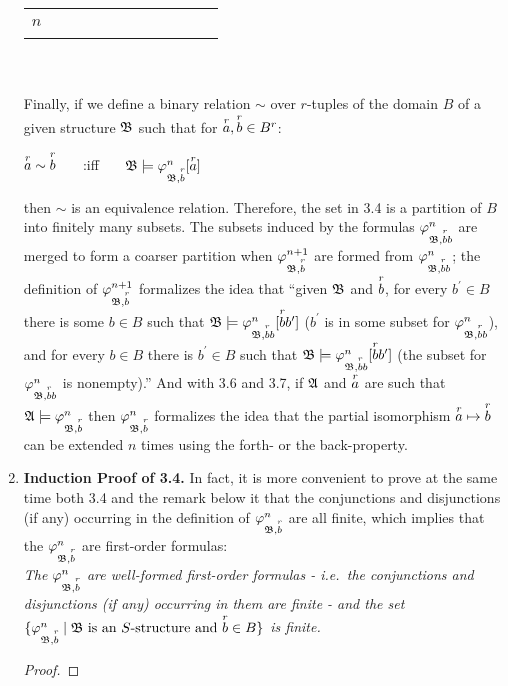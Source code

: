 \begin{enumerate}[1.]
\begin{tabular}{c|ccccccc}
$n$ & \ & \ & \ & \ & \ & \ & \ 
\end{tabular}\\
\ \\
Finally, if we define a binary relation $\sim$ over $r$-tuples of the domain $B$ of a given structure $\struct{B}$ such that for $\vect{a}{r}, \vect{b}{r} \in B^r$:
\begin{medcenter}
$\vect{a}{r} \sim \vect{b}{r}$ \ \ \ :iff \ \ \ $\struct{B} \models \varphi^n_{\struct{B}, \vect{b}{r}}[\vect{a}{r}]$
\end{medcenter}
then $\sim$ is an equivalence relation. Therefore, the set in 3.4 is a partition of $B$ into finitely many subsets. The subsets induced by the formulas $\varphi^n_{\struct{B}, \vect{b}{r}b}$ are merged to form a coarser partition when $\varphi^{n + 1}_{\struct{B}, \vect{b}{r}}$ are formed from $\varphi^n_{\struct{B}, \vect{b}{r}b}$; the definition of $\varphi^{n + 1}_{\struct{B}, \vect{b}{r}}$ formalizes the idea that ``given $\struct{B}$ and $\vect{b}{r}$, for every $b^\prime \in B$ there is some $b \in B$ such that $\struct{B} \models \varphi^n_{\struct{B}, \vect{b}{r}b}[\vect{b}{r}b^\prime]$ ($b^\prime$ is in some subset for $\varphi^n_{\struct{B}, \vect{b}{r}b}$), and for every $b \in B$ there is $b^\prime \in B$ such that $\struct{B} \models \varphi^n_{\struct{B}, \vect{b}{r}b}[\vect{b}{r}b^\prime]$ (the subset for $\varphi^n_{\struct{B}, \vect{b}{r}b}$ is nonempty).'' And with 3.6 and 3.7, if $\struct{A}$ and $\vect{a}{r}$ are such that $\struct{A} \satis \varphi^n_{\struct{B}, \vect{b}{r}}$ then $\varphi^n_{\struct{B}, \vect{b}{r}}$ formalizes the idea that the partial isomorphism $\funbyvect{\vect{a}{r}}{\vect{b}{r}}$ can be extended $n$ times using the forth- or the back-property.
%
\item \textbf{Induction Proof of 3.4.} In fact, it is more convenient to prove at the same time both 3.4 and the remark below it that the conjunctions and disjunctions (if any) occurring in the definition of $\varphi^n_{\struct{B}, \vect{b}{r}}$ are all finite, which implies that the $\varphi^n_{\struct{B}, \vect{b}{r}}$ are first-order formulas:
\medskip\\
\emph{The $\varphi^n_{\struct{B}, \vect{b}{r}}$ are well-formed first-order formulas - i.e.\ the conjunctions and disjunctions (if any) occurring in them are finite - and the set\\$\sett{\varphi^n_{\struct{B}, \vect{b}{r}}}{\(\struct{B}\) is an \(S\)-structure and \(\vect{b}{r} \in B\)}$ is finite.}
\begin{proof}

\end{proof}
\end{enumerate}
